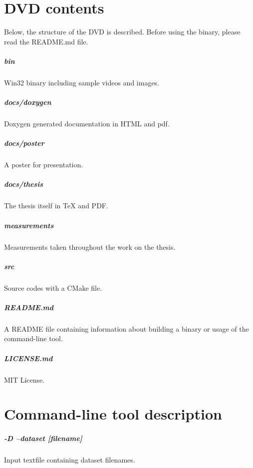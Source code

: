 \chapter{DVD contents}

Below, the structure of the DVD is described. Before using the binary, please read the README.md file.

\paragraph{bin} Win32 binary including sample videos and images.
\paragraph{docs/doxygen} Doxygen generated documentation in HTML and pdf.
\paragraph{docs/poster} A poster for presentation.
\paragraph{docs/thesis} The thesis itself in TeX and PDF.
\paragraph{measurements} Measurements taken throughout the work on the thesis.
\paragraph{src} Source codes with a CMake file.
\paragraph{README.md} A README file containing information about building a binary or usage of the command-line tool.
\paragraph{LICENSE.md} MIT License.

\chapter{Command-line tool description}

\paragraph{-D --dataset [filename]} Input textfile containing dataset filenames.
